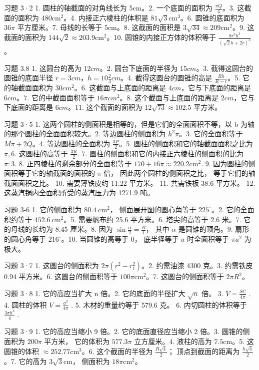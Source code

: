 习题 3·2 1. 圆柱的轴截面的对角线长为 5cm。2. 一个底面的面积为
\(\frac{\pi Q}{4}\)。3. 这截面的面积为 \(480\mathrm{cm}^2\)。4.
内接正六棱柱的体积是 \(81\sqrt{3}\mathrm{cm}^3\)。6. 圆锥的底面积为
\(36\pi\) 平方厘米。7. 母线的长等于 \(5\mathrm{cm}\)。8. 这截面的面积是
\(3\sqrt{34} \approx 209\mathrm{cm}^2\)。9. 这截面的面积为
\(144\sqrt{2} \approx 203.9\mathrm{cm}^2\)。10.
圆锥的内接正方体的体积等于 \(\frac{8r^3h^3}{(\sqrt{2}h + 2r)^3}\)。

习题 3.8 1. 这圆台的高为 \(12cm\)。2. 圆台下底面的半径为 \(15cm\)。3.
截得这圆台的圆锥的底面半径 \(r=3cm\)，\(h=10\frac{2}{3}cm\)。4.
截得这圆台的圆锥的高是 \(\frac{Rh}{R-r}\)。5. 它的轴截面面积为
\(30cm^2\)。6. 这截面与上底面的距离是 \(4cm\)，它与下底面的距离是
\(6cm\)。7. 它的中截面面积等于 \(16\pi cm^2\)。8.
这个截面与上底面的距离是 \(2cm\)，它与下底面的距离是 \(6cm\)。11.
这个截面的面积为 \(12\sqrt{73} \approx 102.5\) 平方米。

习题 3·5 1. 这两个圆柱的侧面积是相等的，但是它们的全面面积不等，以 b
为轴的那个圆柱的全面面积较大。2. 等边圆柱的侧面积为 \(h^{2}\pi\)。3.
它的全面积等于 \(M\pi + 2Q\)。4. 等边圆柱的全面积为 \(\frac{3P}{2}\)。5.
圆柱的侧面积和它的轴截面面积之比为 \(\pi, 6\). 这圆柱的高等于
\(\frac{3R}{2}\). 7. 圆柱的侧面积和它的内接正六棱柱的侧面积的比为
\(\pi:3\). 8. 正四棱柱的剩余部分的全面积等于
\(170 + 16\pi \approx 220.2\mathrm{cm}^2\). 9.
因为圆柱的侧面积等于它的轴截面的面积的 \(\pi\) 倍，
因此两个圆柱的侧面积之比， 等于它们的轴截面面积之比。 10. 需要薄铁皮约
11.22 平方米。 11. 共需铁板 38.6 平方米。 12.
这蒸汽锅内全面积所受的蒸汽压力为 1271.9 吨。

习题 3-6 1. 它的侧面积为 \(80.4 \mathrm{~cm}^{2}\)，
侧面展开图的圆心角等于 \(225^{\circ}\)。2. 它的全面积约等于
\(452.6 \mathrm{~cm}^{2}\)。5. 需要帆布约 25.6 平方米。6. 塔尖的高等于
2.6 米。7. 它的母线的长约为 8.45 厘米。8. 因为
\(\sin \frac{\alpha}{2} = \frac{R}{l}\)， 其中 \(\alpha\)
是圆锥的顶角。9. 扇形的圆心角等于 \(216^{\circ}\)。10. 当圆锥的高等于
0， 底半径等于 \(a\) 时全面积等于 \(\pi a^{2}\) 为极大。

习题 3·7 1. 这圆台的侧面积为 \(2\pi (r^2 - r_1^2)\)。2. 约需油漆 4300
克。3. 约需铁皮 0.94 平方米。6. 这圆台的侧面积等于
\(100\pi \mathrm{cm}^2\)。7. 这圆台的侧面积等于 \(2\pi R^2\)。

习题 3·8 1. 它的高应当扩大 n 倍。2. 它的底面的半径扩大 \(\sqrt{n}\) 倍。
3. \(V=\frac{SC}{4\pi}\) . 4. 圆柱的体积 \(V=\frac{a^{3}}{4\pi}\) . 5.
木材的重量约等于 579.6 克。 6. 内切圆柱的体积等于
\(\frac{3\pi h^{3}}{4}\) .

习题 3·9 1. 它的高应当缩小 9 倍。2. 它的底面直径应当缩小 2 倍。3.
圆锥的侧面积为 \(200\pi\) 平方米， 它的体积为 \(577.3\pi\) 立方厘米。4.
液柱的高为 \(7.5\mathrm{cm}\)。5. 这圆锥的体积
\(\approx 252.77\mathrm{cm}^3\)。6. 这个截面的半径为
\(\frac{R\sqrt{4}}{2}\)； 顶点到截面的距离为 \(\frac{h\sqrt{4}}{2}\)。7.
它的高为 \(3\sqrt{3}\mathrm{cm}\)， 侧面积为 \(18\pi\mathrm{cm}^2\)。


